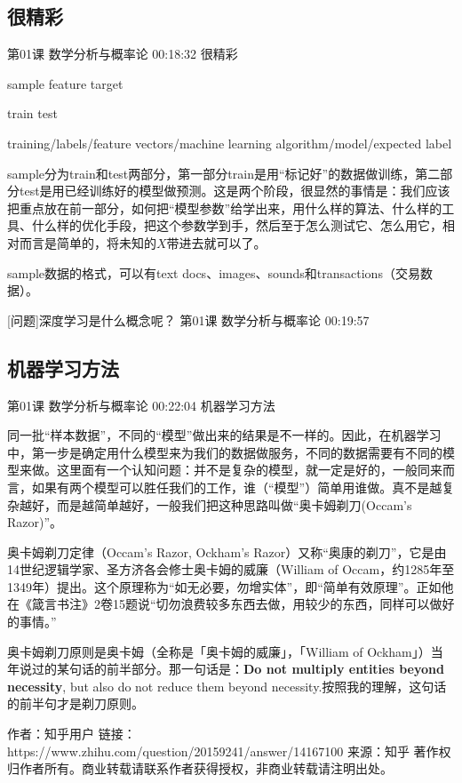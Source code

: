\documentclass[UTF8]{ctexart}
\begin{document}
\subsection{很精彩}

第01课 数学分析与概率论 00:18:32 很精彩

sample feature target

train test

training/labels/feature vectors/machine learning algorithm/model/expected label

sample分为train和test两部分，第一部分train是用“标记好”的数据做训练，第二部分test是用已经训练好的模型做预测。这是两个阶段，很显然的事情是：我们应该把重点放在前一部分，如何把“模型参数”给学出来，用什么样的算法、什么样的工具、什么样的优化手段，把这个参数学到手，然后至于怎么测试它、怎么用它，相对而言是简单的，将未知的$X$带进去就可以了。

sample数据的格式，可以有text docs、images、sounds和transactions（交易数据）。

[问题]深度学习是什么概念呢？ 第01课 数学分析与概率论 00:19:57

\subsection{机器学习方法}

第01课 数学分析与概率论 00:22:04 机器学习方法

同一批“样本数据”，不同的“模型”做出来的结果是不一样的。因此，在机器学习中，第一步是确定用什么模型来为我们的数据做服务，不同的数据需要有不同的模型来做。这里面有一个认知问题：并不是复杂的模型，就一定是好的，一般同来而言，如果有两个模型可以胜任我们的工作，谁（“模型”）简单用谁做。真不是越复杂越好，而是越简单越好，一般我们把这种思路叫做“奥卡姆剃刀(Occam's Razor)”。

奥卡姆剃刀定律（Occam's Razor, Ockham's Razor）又称“奥康的剃刀”，它是由14世纪逻辑学家、圣方济各会修士奥卡姆的威廉（William of Occam，约1285年至1349年）提出。这个原理称为“如无必要，勿增实体”，即“简单有效原理”。正如他在《箴言书注》2卷15题说“切勿浪费较多东西去做，用较少的东西，同样可以做好的事情。”

奥卡姆剃刀原则是奥卡姆（全称是「奥卡姆的威廉」，「William of Ockham」）当年说过的某句话的前半部分。那一句话是：\textbf{Do not multiply entities beyond necessity}, but also do not reduce them beyond necessity.按照我的理解，这句话的前半句才是剃刀原则。

作者：知乎用户
链接：https://www.zhihu.com/question/20159241/answer/14167100
来源：知乎
著作权归作者所有。商业转载请联系作者获得授权，非商业转载请注明出处。
\end{document}
